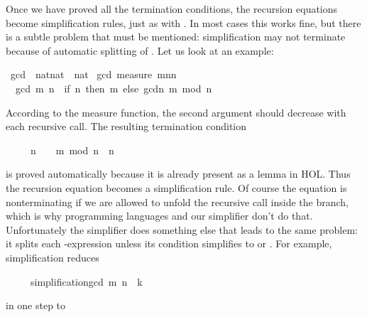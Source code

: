 %
\begin{isabellebody}%
\def\isabellecontext{simplification}%
\isamarkupfalse%
%
\begin{isamarkuptext}%
Once we have proved all the termination conditions, the  
recursion equations become simplification rules, just as with
. In most cases this works fine, but there is a subtle
problem that must be mentioned: simplification may not
terminate because of automatic splitting of .
Let us look at an example:%
\end{isamarkuptext}%
\isamarkuptrue%
\ gcd\ {\isacharcolon}{\isacharcolon}\ {\isachardoublequote}nat{\isasymtimes}nat\ {\isasymRightarrow}\ nat{\isachardoublequote}\isanewline
\isamarkupfalse%
\ gcd\ {\isachardoublequote}measure\ {\isacharparenleft}{\isasymlambda}{\isacharparenleft}m{\isacharcomma}n{\isacharparenright}{\isachardot}n{\isacharparenright}{\isachardoublequote}\isanewline
\ \ {\isachardoublequote}gcd\ {\isacharparenleft}m{\isacharcomma}\ n{\isacharparenright}\ {\isacharequal}\ {\isacharparenleft}if\ n{\isacharequal}{}\ then\ m\ else\ gcd{\isacharparenleft}n{\isacharcomma}\ m\ mod\ n{\isacharparenright}{\isacharparenright}{\isachardoublequote}\isamarkupfalse%
%
\begin{isamarkuptext}%
\noindent
According to the measure function, the second argument should decrease with
each recursive call. The resulting termination condition
\begin{isabelle}%
\ \ \ \ \ n\ {\isasymnoteq}\ {}\ {\isasymLongrightarrow}\ m\ mod\ n\ {\isacharless}\ n%
\end{isabelle}
is proved automatically because it is already present as a lemma in
HOL\@.  Thus the recursion equation becomes a simplification
rule. Of course the equation is nonterminating if we are allowed to unfold
the recursive call inside the  branch, which is why programming
languages and our simplifier don't do that. Unfortunately the simplifier does
something else that leads to the same problem: it splits 
each -expression unless its
condition simplifies to  or .  For
example, simplification reduces
\begin{isabelle}%
\ \ \ \ \ simplification{\isachardot}gcd\ {\isacharparenleft}m{\isacharcomma}\ n{\isacharparenright}\ {\isacharequal}\ k%
\end{isabelle}
in one step to
\begin{isabelle}%

\end{isabelle}
\end{isamarkuptext}
\end{isabellebody}
